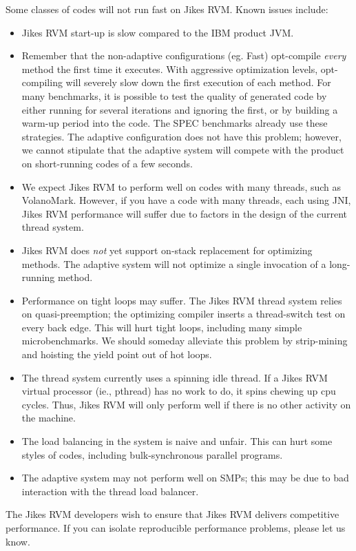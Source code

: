 Some classes of codes will not run fast on Jikes RVM.  Known issues include:
\begin{itemize}
\item Jikes RVM start-up is slow compared to the IBM product JVM.
\item Remember that the non-adaptive configurations (eg. Fast) opt-compile
{\em every} method the first time it executes.  With aggressive optimization
levels, opt-compiling will severely slow down the first execution of
each method.  For many benchmarks, it is possible to test the quality
of generated code by either running for several iterations and ignoring
the first, or by building a warm-up period into the code.  The SPEC benchmarks
already use these strategies.  The adaptive configuration does not
have this problem; however, we cannot stipulate that the adaptive
system will compete with the product on short-running codes of a few seconds.
\item We expect Jikes RVM to perform well on codes with many threads, such as
VolanoMark.  However, if you have a code with many threads, each using
JNI, Jikes RVM performance will suffer due to factors in the design of
the current thread system.
\item Jikes RVM does {\em not} yet support on-stack replacement for
optimizing methods.  The adaptive system will not optimize a single
invocation of a long-running 
method.
\item Performance on tight loops may suffer.  The Jikes RVM thread system
relies on quasi-preemption; the optimizing compiler inserts a thread-switch
test on every back edge.  This will hurt tight loops, including many
simple microbenchmarks.  We should someday alleviate this problem by
strip-mining and hoisting the yield point out of hot loops.
\item The thread system currently uses a spinning idle thread. If a
Jikes RVM
virtual processor (ie., pthread) has no work to do, it spins chewing up
cpu cycles.  Thus, Jikes RVM will only perform well if there is no other activity on the machine.
\item The load balancing in the system is naive and unfair.  This can hurt some styles of codes, including bulk-synchronous parallel programs.
\item The adaptive system may not perform well on SMPs; this may be due to bad
interaction with the thread load balancer.
\end{itemize}

The Jikes RVM developers wish to ensure that Jikes RVM delivers
competitive performance. 
If you can isolate reproducible performance problems, please let us
know. 

\AIXTMFooter
